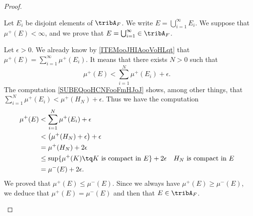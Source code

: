 \begin{proof}
\begin{subproof}
		Let \( E_i\) be disjoint elements of \( \tribA_F\). We write \( E=\bigcup_{i=1}^{\infty}E_i\). We suppose that \( \mu^+(E)<\infty\), and we prove that \( E=\bigcup_{i=1}^{\infty}\in \tribA_F\).

		Let \( \epsilon>0\). We already know by \ref{ITEMooJHIAooVoHLqt} that \(  \mu^+(E)=\sum_{i=1}^{\infty}\mu^+(E_i)  \). It means that there exists \( N>0\) such that
		\begin{equation}
			\mu^+(E)<\sum_{i=1}^N\mu^+(E_i)+\epsilon.
		\end{equation}
		The computation \eqref{SUBEQooHCNFooFmHJoJ} shows, among other things, that \( \sum_{i=1}^N\mu^+(E_i)<\mu^+(H_N)+\epsilon\). Thus we have the computation
		\begin{subequations}
			\begin{align}
				\mu^+(E) & <\sum_{i=1}^N\mu^+(E_i)+\epsilon                                                                               \\
				         & <\big( \mu^+(H_N)+\epsilon \big)+\epsilon                                                                      \\
				         & =\mu^+(H_N)+2\epsilon                                                                                          \\
				         & \leq \sup\{ \mu^+(K)\tq \text{\( K\) is compact in \( E\)} \}+2\epsilon & \text{\( H_N\) is compact in \( E\)} \\
				         & =\mu^-(E)+2\epsilon.
			\end{align}
		\end{subequations}
		We proved that \( \mu^+(E)\leq \mu^-(E)\). Since we always have \( \mu^+(E)\geq \mu^-(E)\), we deduce that \( \mu^+(E)=\mu^-(E)\) and then that \( E\in \tribA_F\).

		\spitem[\( \mu^+(V\cup K)=\mu^+(V)+\mu^+(K)\) if \( V\cap K=\emptyset\)]         \label{ITEMooZSUIooPrPhtD}


\end{subproof}
\end{proof}
